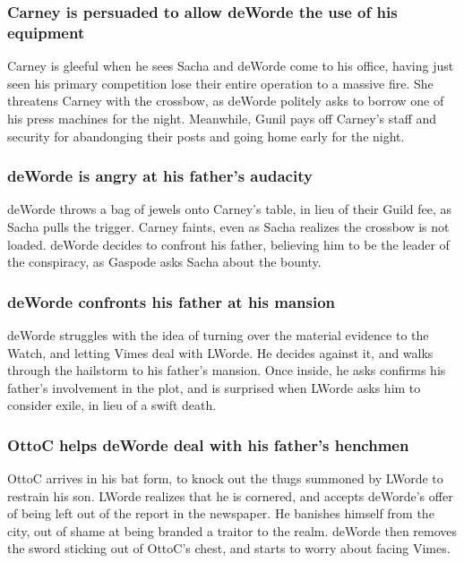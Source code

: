 \subsubsection{\Gls{Carney} is persuaded to allow \Gls{deWorde} the use of his equipment}
\Gls{Carney} is gleeful when he sees \Gls{Sacha} and \Gls{deWorde} come to his office, having
just seen his primary competition lose their entire operation to a massive fire. She threatens
\Gls{Carney} with the crossbow, as \Gls{deWorde} politely asks to borrow one of his press machines
for the night. Meanwhile, \Gls{Gunil} pays off \Gls{Carney}'s staff and security for abandonging
their posts and going home early for the night.

\subsubsection{\Gls{deWorde} is angry at his father's audacity}
\Gls{deWorde} throws a bag of jewels onto \Gls{Carney}'s table, in lieu of their Guild fee, as
\Gls{Sacha} pulls the trigger. \Gls{Carney} faints, even as \Gls{Sacha} realizes the crossbow is
not loaded. \Gls{deWorde} decides to confront his father, believing him to be the leader of the
conspiracy, as \Gls{Gaspode} asks \Gls{Sacha} about the bounty.

\subsubsection{\Gls{deWorde} confronts his father at his mansion}
\Gls{deWorde} struggles with the idea of turning over the material evidence to the Watch, and
letting \Gls{Vimes} deal with \Gls{LWorde}. He decides against it, and walks through the hailstorm
to his father's mansion. Once inside, he asks confirms his father's involvement in the plot, and
is surprised when \Gls{LWorde} asks him to consider exile, in lieu of a swift death.

\subsubsection{\Gls{OttoC} helps \Gls{deWorde} deal with his father's henchmen}
\Gls{OttoC} arrives in his bat form, to knock out the thugs summoned by \Gls{LWorde} to restrain
his son. \Gls{LWorde} realizes that he is cornered, and accepts \Gls{deWorde}'s offer of being
left out of the report in the newspaper. He banishes himself from the city, out of shame at being
branded a traitor to the realm. \Gls{deWorde} then removes the sword sticking out of \Gls{OttoC}'s
chest, and starts to worry about facing \Gls{Vimes}.

